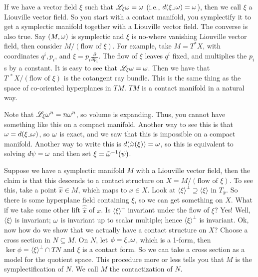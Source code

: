  If we have a vector field $\xi$ such that $\mathscr{L}_\xi \omega = \omega$ (i.e.,
 $d(\xi\lrcorner \omega)=\omega$), then we call $\xi$ a Liouville vector
 field.  So you start with a contact manifold, you symplectify it
 to get a symplectic manifold together with a Liouville vector
 field.  The converse is also true.  Say $(M,\omega)$ is symplectic
 and $\xi$ is no-where vanishing Liouville vector field, then
 consider $M/(\text{flow of }\xi)$.  For example, take $M=T^*X$,
 with coordinates $q^i,p_i$, and $\xi = p_i\frac{\partial}{\partial
 p_i}$.  The flow of $\xi$ leaves $q^i$ fixed, and multiplies the
 $p_i$s by a constant.  It is easy to see that $\mathscr{L}_\xi \omega = \omega$.
 Then we have that $T^{\cdot *}X/(\text{flow of }\xi)$ is the
 cotangent ray bundle.  This is the same thing as the space of
 co-oriented hyperplanes in $TM$.  $TM$ is a contact manifold in a
 natural way.

 Note that $\mathscr{L}_\xi \omega^n = n\omega^n$, so volume is expanding.  Thus,
 you cannot have something like this on a compact manifold.
 Another way to see this is that $\omega = d(\xi\lrcorner\omega)$, so $\omega$
 is exact, and we saw that this is impossible on a compact
 manifold.  Another way to write this is $d(\tilde{\omega}(\xi))=\omega$, so
 this is equivalent to solving $d\psi = \omega$ and then set $\xi =
 \tilde{\omega}^{-1}(\psi)$.

 Suppose we have a symplectic manifold $M$ with a Liouville vector
 field, then the claim is that this descends to a contact
 structure on $X = M/(\text{flow of }\xi)$.  To see this, take a point
 $\hat x\in M$, which maps to $x\in X$.  Look at $\langle
 \xi\rangle^\perp\supseteq \langle \xi\rangle$ in $T_{\hat x}$.  So there is some
 hyperplane field containing $\xi$, so we can get something on
 $X$.  What if we take some other lift $\hat{\hat x}$ of $x$.  Is
 $\langle \xi\rangle^\perp$ invariant under the flow of $\xi$?
 Yes!  Well, $\langle \xi \rangle$ is invariant; $\omega$ is invariant
 up to scalar multiple; hence $\langle \xi\rangle^\perp$ is
 invariant.  Ok, now how do we show that we actually have a
 contact structure on $X$?  Choose a cross section in $N\subseteq
 M$.  On $N$, let $\phi= \xi\lrcorner \omega$, which is a 1-form, then
 $\ker \phi = \langle \xi\rangle^\perp \cap TN$ and $\xi$ is a
 contact form.  So we can take a cross section as a model for the
 quotient space.  This procedure more or less tells you that $M$
 is the symplectification of $N$.  We call $M$ the contactization
 of $N$.

